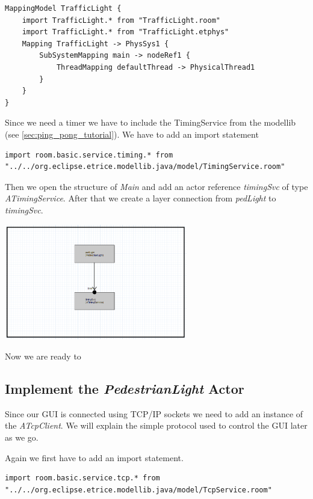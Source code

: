 \begin{lstlisting}[language=etmap]
MappingModel TrafficLight {
	import TrafficLight.* from "TrafficLight.room"
	import TrafficLight.* from "TrafficLight.etphys"
	Mapping TrafficLight -> PhysSys1 {
		SubSystemMapping main -> nodeRef1 {
			ThreadMapping defaultThread -> PhysicalThread1
		}
	}
}
\end{lstlisting}

Since we need a timer we have to include the TimingService from the modellib (see \ref{sec:ping_pong_tutorial}).
We have to add an import statement

\begin{lstlisting}[language=ROOM]
import room.basic.service.timing.* from "../../org.eclipse.etrice.modellib.java/model/TimingService.room"
\end{lstlisting}

Then we open the structure of \textit{Main} and add an actor reference \textit{timingSvc} of type \textit{ATimingService}.
After that we create a layer connection from \textit{pedLight} to \textit{timingSvc}.

\includegraphics[width=0.6\textwidth]{images/018-timingSvc.png}

Now we are ready to 

\subsection{Implement the \textit{PedestrianLight} Actor}

Since our GUI is connected using TCP/IP sockets we need to add an instance of the \textit{ATcpClient}.
We will explain the simple protocol used to control the GUI later as we go.

Again we first have to add an import statement.

\begin{lstlisting}[language=ROOM]
import room.basic.service.tcp.* from "../../org.eclipse.etrice.modellib.java/model/TcpService.room"
\end{lstlisting}

